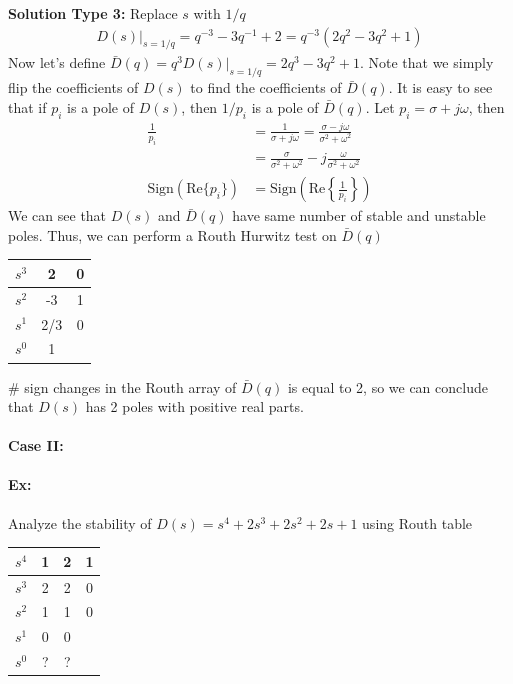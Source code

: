 \documentclass[twoside]{article}
\begin{document}
\textbf{Solution Type 3:} Replace $s$ with $1/q$
%
\begin{align*}
  D(s)|_{s =1/q} = q^{-3} - 3 q^{-1} + 2 = q^{-3} 
  \left( 2 q^{2} - 3 q^2 + 1 \right)
\end{align*}
%
Now let's define $\bar{D}(q) = q^3 D(s)|_{s =1/q} =  2 q^3 - 3 q^2 +
1$. 
Note that we simply flip the coefficients of $D(s)$
to find the coefficients of $\bar{D}(q)$. It is easy to see that 
if $p_i$ is a pole of $D(s)$, then $1/p_i$ is a pole of $\bar{D}(q)$.
Let $p_i = \sigma + j \omega$, then 
%
\begin{align*}
  \frac{1}{p_i} &= \frac{1}{\sigma + j \omega} = \frac{\sigma - j
  \omega}{\sigma^2 + \omega^2}
\\
&= \frac{\sigma}{\sigma^2 + \omega^2} - j \frac{
  \omega}{\sigma^2 + \omega^2}
\\
\mathrm{Sign} ( \mathrm{Re} \lbrace p_i \rbrace ) &= 
\mathrm{Sign} \left( \mathrm{Re} \left\lbrace \frac{1}{p_i} \right\rbrace \right)
\end{align*}
%
We can see that $D(s)$ and $\bar{D}(q)$ have same number of stable
and unstable poles. Thus, we can perform a Routh Hurwitz test on
$\bar{D}(q)$
%
\begin{table}[h]
\begin{center}
\begin{tabular}{|c || c || c  |}
\hline
$s^3$ & 2 & 0 
\\ \hline
$s^2$ & -3 & 1
\\ \hline
$s^1$  & 2/3 & 0 
\\ \hline
$s^0$  & 1 & 
\\ \hline
\end{tabular}
\end{center}
\end{table}

$\#$ sign changes in the Routh array of $\bar{D}(q)$ is equal to 2, so
we can conclude that $D(s)$ has 2 poles with positive real parts.

\paragraph{Case II:}

\paragraph{Ex:} Analyze the stability of $D(s) = s^4 + 2 s^3 + 2 s^2 + 2 s + 1$ using Routh table

\begin{minipage}[h]{1\linewidth}
\begin{center}
\begin{tabular}{|c || c || c c |}
\hline
$s^4$ & 1 & 2 & 1 
\\ \hline
$s^3$ & 2 & 2 & 0
\\ \hline
$s^2$ & 1 & 1 & 0
\\ \hline
$s^1$ & 0 & 0 &
\\ \hline
$s^0$ & ? & ? & 
\\ \hline
\end{tabular}
\end{center}
\end{minipage}
\end{document}
